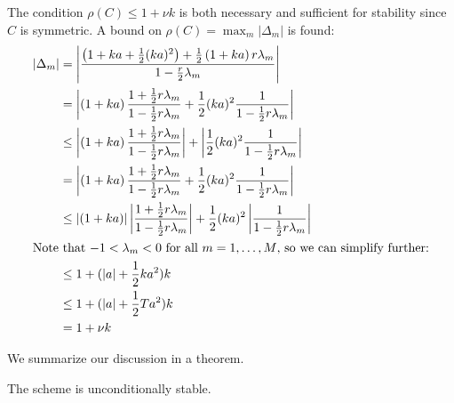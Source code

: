 The condition \( \rho(C) \le 1 + \nu k \) is
both necessary and sufficient for stability since \( C \) is symmetric.
A bound on \( \rho(C) = \max_{m} \lvert \Delta_m \rvert \) is found:
\begin{align}
  \left\lvert \Delta_m \right\rvert &= 
\left\lvert \frac{\left(1+ka+\frac{1}{2}(ka)^2\right) + \frac{1}{2}\left(1+ka\right)r \lambda_m}
{1 - \frac{r}{2} \lambda_m} \right\rvert \\
 &= 
 \left\lvert \left(1+ka\right)\frac{1+\frac{1}{2}r \lambda_m}{1 - \frac{1}{2}r \lambda_m} + \frac{1}{2}(ka)^2 \frac{1}{1 - \frac{1}{2}r \lambda_m} \right\rvert \\
 &\le \left\lvert \left(1+ka\right)\frac{1+\frac{1}{2}r \lambda_m}{1 - \frac{1}{2}r \lambda_m} \right\rvert + \left\lvert\frac{1}{2}(ka)^2 \frac{1}{1 - \frac{1}{2}r \lambda_m} \right\rvert \\
 &= 
 \left\lvert \left(1+ka\right)\frac{1+\frac{1}{2}r \lambda_m}{1 - \frac{1}{2}r \lambda_m} + \frac{1}{2}(ka)^2 \frac{1}{1 - \frac{1}{2}r \lambda_m} \right\rvert \\
 &\le \left\lvert \left(1+ka\right) \right\rvert \left\lvert \frac{1+\frac{1}{2}r \lambda_m}{1 - \frac{1}{2}r \lambda_m} \right\rvert + \frac{1}{2}(ka)^2 \left\lvert\frac{1}{1 - \frac{1}{2}r \lambda_m} \right\rvert \\
 \intertext{Note that \( -1 < \lambda_m < 0  \) for all \( m = 1, \dots, M \), so we can simplify further:}
 &\le 1 + (\lvert a \rvert + \frac{1}{2}k a^2 )k \\
 &\le 1 + (\lvert a \rvert + \frac{1}{2}T a^2)k \\
 &= 1 + \nu k
\end{align}

We summarize our discussion in a theorem.

\begin{theorem}
    The scheme is unconditionally stable.
\end{theorem}

